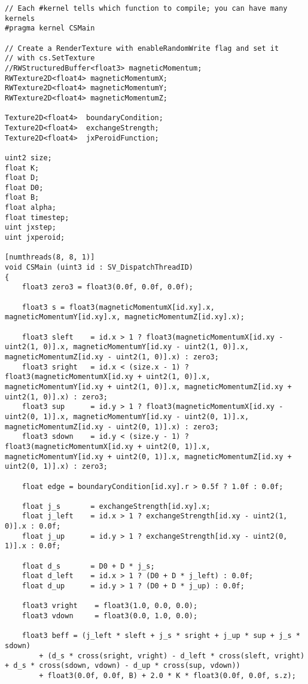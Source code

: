 \documentclass[aps,superscriptaddress,groupedaddress]{revtex4}  %
\begin{document}
\begin{lstlisting}
// Each #kernel tells which function to compile; you can have many kernels
#pragma kernel CSMain

// Create a RenderTexture with enableRandomWrite flag and set it
// with cs.SetTexture
//RWStructuredBuffer<float3> magneticMomentum;
RWTexture2D<float4> magneticMomentumX;
RWTexture2D<float4> magneticMomentumY;
RWTexture2D<float4> magneticMomentumZ;

Texture2D<float4>  boundaryCondition;
Texture2D<float4>  exchangeStrength;
Texture2D<float4>  jxPeroidFunction;

uint2 size;
float K;
float D;
float D0;
float B;
float alpha;
float timestep;
uint jxstep;
uint jxperoid;

[numthreads(8, 8, 1)]
void CSMain (uint3 id : SV_DispatchThreadID)
{
    float3 zero3 = float3(0.0f, 0.0f, 0.0f);

    float3 s = float3(magneticMomentumX[id.xy].x, magneticMomentumY[id.xy].x, magneticMomentumZ[id.xy].x);

    float3 sleft    = id.x > 1 ? float3(magneticMomentumX[id.xy - uint2(1, 0)].x, magneticMomentumY[id.xy - uint2(1, 0)].x, magneticMomentumZ[id.xy - uint2(1, 0)].x) : zero3;
    float3 sright   = id.x < (size.x - 1) ? float3(magneticMomentumX[id.xy + uint2(1, 0)].x, magneticMomentumY[id.xy + uint2(1, 0)].x, magneticMomentumZ[id.xy + uint2(1, 0)].x) : zero3;
    float3 sup      = id.y > 1 ? float3(magneticMomentumX[id.xy - uint2(0, 1)].x, magneticMomentumY[id.xy - uint2(0, 1)].x, magneticMomentumZ[id.xy - uint2(0, 1)].x) : zero3;
    float3 sdown    = id.y < (size.y - 1) ? float3(magneticMomentumX[id.xy + uint2(0, 1)].x, magneticMomentumY[id.xy + uint2(0, 1)].x, magneticMomentumZ[id.xy + uint2(0, 1)].x) : zero3;

    float edge = boundaryCondition[id.xy].r > 0.5f ? 1.0f : 0.0f;

    float j_s       = exchangeStrength[id.xy].x;
    float j_left    = id.x > 1 ? exchangeStrength[id.xy - uint2(1, 0)].x : 0.0f;
    float j_up      = id.y > 1 ? exchangeStrength[id.xy - uint2(0, 1)].x : 0.0f;

    float d_s       = D0 + D * j_s;
    float d_left    = id.x > 1 ? (D0 + D * j_left) : 0.0f;
    float d_up      = id.y > 1 ? (D0 + D * j_up) : 0.0f;

    float3 vright    = float3(1.0, 0.0, 0.0);
    float3 vdown     = float3(0.0, 1.0, 0.0);

    float3 beff = (j_left * sleft + j_s * sright + j_up * sup + j_s * sdown)
        + (d_s * cross(sright, vright) - d_left * cross(sleft, vright) + d_s * cross(sdown, vdown) - d_up * cross(sup, vdown))
        + float3(0.0f, 0.0f, B) + 2.0 * K * float3(0.0f, 0.0f, s.z);


\end{lstlisting}
\end{document}
